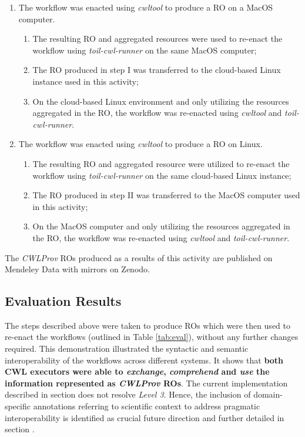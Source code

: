 \documentclass[a4paper,num-refs]{oup-contemporary}
\begin{document}
\begin{enumerate}[label=\Roman*)]
  \item The workflow was enacted using \textit{cwltool} to produce a RO on a MacOS computer. 
\begin{enumerate} [label=\arabic*)]
  \item The resulting RO and aggregated resources were used to re-enact the workflow using \textit{toil-cwl-runner} on the same MacOS computer;
  \item The RO produced in step I was transferred to the cloud-based Linux instance used in this activity;
  \item On the cloud-based Linux environment and only utilizing the resources aggregated in the RO, the workflow was re-enacted using \textit{cwltool} and \textit{toil-cwl-runner}.
\end{enumerate}
  \item The workflow was enacted using \textit{cwltool} to produce a RO on Linux.
\begin{enumerate} [label=\arabic*)]
  \item The resulting RO and aggregated resource were utilized to re-enact the workflow using \textit{toil-cwl-runner} on the same cloud-based Linux instance;
  \item The RO produced in step II was transferred to the MacOS computer used in this activity;
  \item On the MacOS computer and only utilizing the resources aggregated in the RO, the workflow was re-enacted using \textit{cwltool} and \textit{toil-cwl-runner}.
\end{enumerate}
\end{enumerate}
The \textit{CWLProv} ROs produced as a results of this activity are published on Mendeley Data \citep{rnaseq_mendeley, alignment_mendeley, somatic_mendeley} with mirrors on Zenodo. 

\subsection{Evaluation Results} \label{sec:eval-results}
The steps described above were taken to produce ROs which were then used to re-enact the workflows (outlined in Table \ref{tab:eval}), without any further changes required. This demonstration illustrated the syntactic and semantic interoperability of the workflows across different systems. It shows that \textbf{both CWL executors were able to \textit{exchange}, \textit{comprehend} and \textit{use} the information represented as \textit{CWLProv} ROs}. The current implementation described in section \textbf{} does not resolve \textit{Level 3}. Hence, the inclusion of domain-specific annotations referring to scientific context to address pragmatic interoperability is identified as crucial future direction and further detailed in section \textbf{}.
\end{document}
